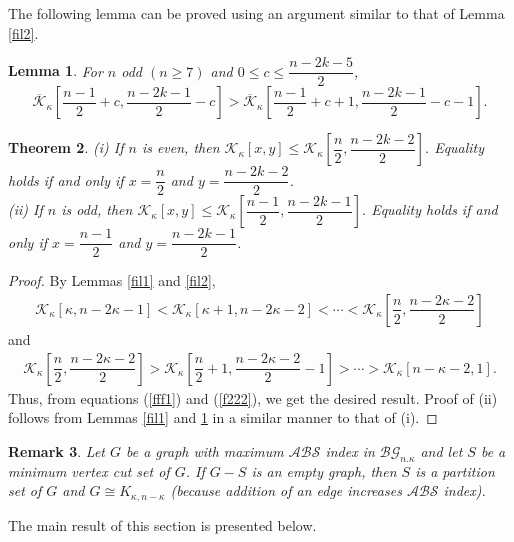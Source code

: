 \documentclass[12pt]{article}
\newtheorem{theorem}{Theorem}[section]
\newtheorem{lemma}[theorem]{Lemma}
\newtheorem{remark}[theorem]{Remark}
\begin{document}
The following lemma can be proved using an argument similar to that of Lemma \ref{fil2}.
\begin{lemma}\label{fil3} For $n$ odd $(n\ge 7)$ and $0\le c\le \dfrac{n-2k-5}{2}$, 
	$$\overline{\mathcal{K}}_{\kappa}\left[\dfrac{n-1}{2}+c,\dfrac{n-2k-1}{2}-c\right]>\overline{\mathcal{K}}_{\kappa}\left[\dfrac{n-1}{2}+c+1,\dfrac{n-2k-1}{2}-c-1\right].$$
\end{lemma}
\begin{theorem}\label{fffffft2}
(i) If $n$ is even, then $\mathcal{K}_{\kappa}[x,y]\le \mathcal{K}_{\kappa}\left[\dfrac{n}{2},\dfrac{n-2k-2}{2}\right]$.	
Equality holds if and only if $x=\dfrac{n}{2}$ and $y=\dfrac{n-2k-2}{2}$.\\[2mm]
(ii) If $n$ is odd, then $\mathcal{K}_{\kappa}[x,y]\le \mathcal{K}_{\kappa}\left[\dfrac{n-1}{2},\dfrac{n-2k-1}{2}\right]$.	
Equality holds if and only if $x=\dfrac{n-1}{2}$ and $y=\dfrac{n-2k-1}{2}$.
\end{theorem}
\begin{proof}
By Lemmas \ref{fil1} and \ref{fil2},
\begin{align}\label{fff1}\mathcal{K}_{\kappa}[\kappa, n-2\kappa-1]< \mathcal{K}_{\kappa}[\kappa+1, n-2\kappa-2]<\cdots< \mathcal{K}_{\kappa}\left[\dfrac{n}{2},\dfrac{n-2\kappa-2}{2}\right]\end{align}
and 
\begin{align}\label{f222}
\mathcal{K}_{\kappa}\left[\dfrac{n}{2},\dfrac{n-2\kappa-2}{2}\right]> \mathcal{K}_{\kappa}\left[\dfrac{n}{2}+1,\dfrac{n-2\kappa-2}{2}-1\right]>\cdots>\mathcal{K}_{\kappa}\left[n-\kappa-2, 1\right].	
\end{align}
Thus, from equations (\ref{fff1}) and (\ref{f222}), we get the desired result. Proof of (ii) follows from Lemmas  \ref{fil1} and \ref{fil3} in a similar manner to that of (i).
\end{proof}
\begin{remark}\label{empty}
Let $G$ be a graph with maximum $\mathcal{ABS}$ index in $\mathcal{BG}_{n.\kappa}$ and let $S$ be a minimum vertex cut set of $G$. If $G-S$ is an empty graph, then $S$ is a partition set of $G$ and $G\cong K_{\kappa,n-\kappa}$ (because addition of an edge increases $\mathcal{ABS}$ index).    	
\end{remark}
The main result of this section is presented below.
\end{document}
